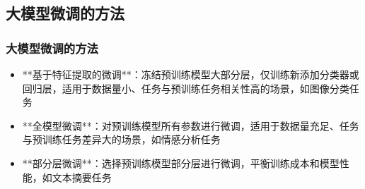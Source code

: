 \subsection{大模型微调的方法}
\begin{frame}
    \frametitle{大模型微调的方法}
    \begin{itemize}
        \item **基于特征提取的微调**：冻结预训练模型大部分层，仅训练新添加分类器或回归层，适用于数据量小、任务与预训练任务相关性高的场景，如图像分类任务
        \item **全模型微调**：对预训练模型所有参数进行微调，适用于数据量充足、任务与预训练任务差异大的场景，如情感分析任务
        \item **部分层微调**：选择预训练模型部分层进行微调，平衡训练成本和模型性能，如文本摘要任务
    \end{itemize}
\end{frame}

